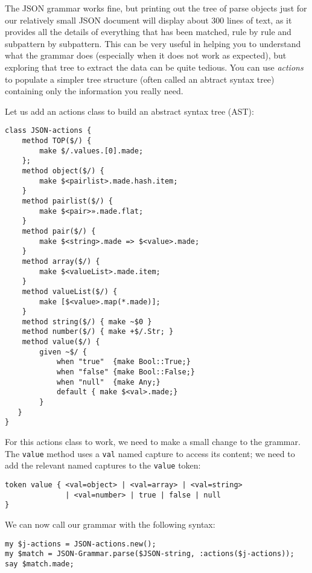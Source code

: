 The JSON grammar works fine, but printing out the tree of 
parse objects just for our relatively small JSON document 
will display about 300 lines of text, as 
it provides all the details of everything that has been 
matched, rule by rule and subpattern by subpattern. This 
can be very useful in helping you to understand what the grammar does 
(especially when it does not work as expected), but 
exploring that tree to extract the data can be quite 
tedious. You can use \emph{actions} to populate a simpler 
tree structure (often called an abtract syntax tree) containing 
only the information you really need. 

Let us add an actions class to build an abstract syntax tree 
(AST):

\begin{verbatim}
class JSON-actions {
    method TOP($/) {
        make $/.values.[0].made;
    };
    method object($/) {
        make $<pairlist>.made.hash.item;
    }
    method pairlist($/) {
        make $<pair>».made.flat;
    }
    method pair($/) {
        make $<string>.made => $<value>.made;
    }
    method array($/) {
        make $<valueList>.made.item;
    }
    method valueList($/) {
        make [$<value>.map(*.made)];
    }
    method string($/) { make ~$0 }
    method number($/) { make +$/.Str; }
    method value($/) { 
        given ~$/ {
            when "true"  {make Bool::True;}
            when "false" {make Bool::False;}
            when "null"  {make Any;}
            default { make $<val>.made;}
        }  
   }
}
\end{verbatim}

For this actions class to work, we need to make a small change 
to the grammar. The {\tt value} method uses a {\tt val} named 
capture to access its content; we need to add the relevant 
named captures to the {\tt value} token:

\begin{verbatim}
token value { <val=object> | <val=array> | <val=string> 
              | <val=number> | true | false | null
}
\end{verbatim}

We can now call our grammar with the following syntax:

\begin{verbatim}
my $j-actions = JSON-actions.new();
my $match = JSON-Grammar.parse($JSON-string, :actions($j-actions));
say $match.made;
\end{verbatim}

